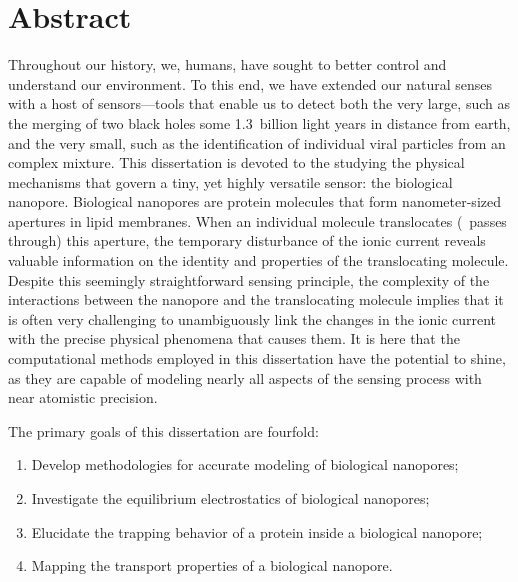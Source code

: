 \chapter{Abstract}
%
\label{ch:abstract}
%

Throughout our history, we, humans, have sought to better control and understand our environment. To this end,
we have extended our natural senses with a host of sensors---tools that enable us to detect both the very
large, such as the merging of two black holes some \num{1.3}~billion light years in distance from earth, and
the very small, such as the identification of individual viral particles from an complex mixture. This
dissertation is devoted to the studying the physical mechanisms that govern a tiny, yet highly versatile
sensor: the biological nanopore. Biological nanopores are protein molecules that form nanometer-sized
apertures in lipid membranes. When an individual molecule translocates (\ie~passes through) this aperture, the
temporary disturbance of the ionic current reveals valuable information on the identity and properties of the
translocating molecule. Despite this seemingly straightforward sensing principle, the complexity of the
interactions between the nanopore and the translocating molecule implies that it is often very challenging to
unambiguously link the changes in the ionic current with the precise physical phenomena that causes them. It
is here that the computational methods employed in this dissertation have the potential to shine, as they are
capable of modeling nearly all aspects of the sensing process with near atomistic precision.

The primary goals of this dissertation are fourfold:
%
\begin{enumerate}
  \item Develop methodologies for accurate modeling of biological nanopores;
  \item Investigate the equilibrium electrostatics of biological nanopores;
  \item Elucidate the trapping behavior of a protein inside a biological nanopore;
  \item Mapping the transport properties of a biological nanopore.
\end{enumerate}
%

